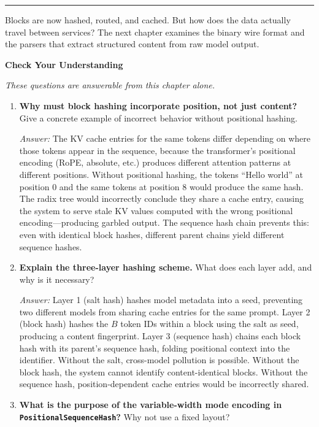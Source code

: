 \medskip
\begin{center}\rule{0.5\linewidth}{0.4pt}\end{center}
\medskip

Blocks are now hashed, routed, and cached. But how does the data actually travel between services? The next chapter examines the binary wire format and the parsers that extract structured content from raw model output.

\medskip
\noindent\textbf{Check Your Understanding}

\smallskip
\noindent\emph{These questions are answerable from this chapter alone.}

\begin{enumerate}
  \item \textbf{Why must block hashing incorporate position, not just content?} Give a concrete example of incorrect behavior without positional hashing.

  \textit{Answer:} The KV cache entries for the same tokens differ depending on where those tokens appear in the sequence, because the transformer's positional encoding (RoPE, absolute, etc.) produces different attention patterns at different positions. Without positional hashing, the tokens ``Hello world'' at position 0 and the same tokens at position 8 would produce the same hash. The radix tree would incorrectly conclude they share a cache entry, causing the system to serve stale KV values computed with the wrong positional encoding---producing garbled output. The sequence hash chain prevents this: even with identical block hashes, different parent chains yield different sequence hashes.

  \item \textbf{Explain the three-layer hashing scheme.} What does each layer add, and why is it necessary?

  \textit{Answer:} Layer 1 (salt hash) hashes model metadata into a seed, preventing two different models from sharing cache entries for the same prompt. Layer 2 (block hash) hashes the $B$ token IDs within a block using the salt as seed, producing a content fingerprint. Layer 3 (sequence hash) chains each block hash with its parent's sequence hash, folding positional context into the identifier. Without the salt, cross-model pollution is possible. Without the block hash, the system cannot identify content-identical blocks. Without the sequence hash, position-dependent cache entries would be incorrectly shared.

  \item \textbf{What is the purpose of the variable-width mode encoding in \texttt{Positional\-Sequence\-Hash}?} Why not use a fixed layout?


\end{enumerate}
